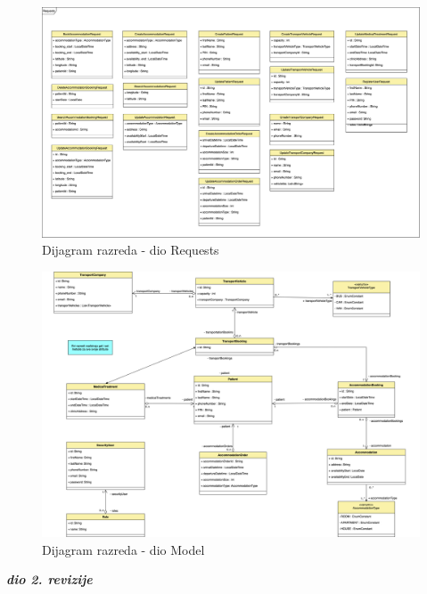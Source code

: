 			\begin{figure}[H]
				\includegraphics[scale=0.08]{slike/arhitektura_requests_class_diagram.png} %
				\centering
				\caption{Dijagram razreda - dio Requests}
				\label{fig:arhitektura_requests_class_diagram}
			\end{figure}
			
			\begin{figure}[H]
				\includegraphics[scale=0.08]{slike/arhitektura_model_class_diagram.png} %
				\centering
				\caption{Dijagram razreda - dio Model}
				\label{fig:arhitektura_model_class_diagram}
			\end{figure}
			
			\textbf{\textit{dio 2. revizije}}\\			
			

